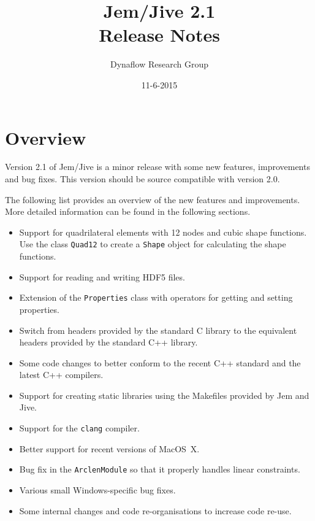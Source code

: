 \documentclass[a4paper]{article}
\title {Jem/Jive 2.1\\[1ex]
        Release Notes}
\author{Dynaflow Research Group}
\date  {11-6-2015}
\newcommand{\Code}[1]{\texttt{#1}}
\begin{document}
\maketitle

\section{Overview}

Version 2.1 of Jem/Jive is a minor release with some new features,
improvements and bug fixes. This version should be source compatible with
version 2.0.

The following list provides an overview of the new features and
improvements. More detailed information can be found in the following
sections.

\begin{itemize}

  \item Support for quadrilateral elements with 12 nodes and cubic shape
        functions. Use the class \Code{Quad12} to create a \Code{Shape}
        object for calculating the shape functions.

  \item Support for reading and writing HDF5 files.

  \item Extension of the \Code{Properties} class with operators for
        getting and setting properties.

  \item Switch from headers provided by the standard C library to
        the equivalent headers provided by the standard C++ library.

  \item Some code changes to better conform to the recent C++ standard
        and the latest C++ compilers.

  \item Support for creating static libraries using the Makefiles
        provided by Jem and Jive.

  \item Support for the \Code{clang} compiler.

  \item Better support for recent versions of MacOS~X.

  \item Bug fix in the \Code{ArclenModule} so that it properly handles
        linear constraints.

  \item Various small Windows-specific bug fixes.

  \item Some internal changes and code re-organisations to increase code
        re-use.

\end{itemize}
\end{document}
